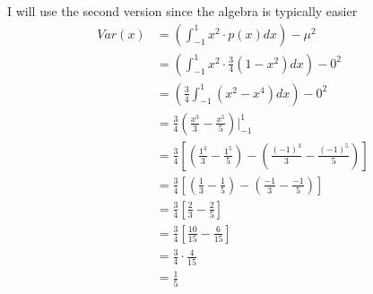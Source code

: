 \documentclass[10pt]{article}
\begin{document}
{\begin{solution}
I will use the second version since the algebra is typically easier
\begin{align*}
Var(x)&=\left( \int_{-1}^1 x^2 \cdot p(x) dx \right) -\mu^2\\
&=\left( \int_{-1}^1 x^2 \cdot \frac{3}{4}(1-x^2) dx \right) -0^2\\
&=\left( \frac{3}{4}\int_{-1}^1 (x^2-x^4) dx \right) -0^2\\
&=\frac{3}{4}\left(\frac{x^3}{3}-\frac{x^5}{5} \right)\Bigg|_{-1}^1\\
&=\frac{3}{4}\left[ \left(\frac{1^3}{3}-\frac{1^5}{5} \right)-\left(\frac{(-1)^3}{3}-\frac{(-1)^5}{5} \right)\right]\\
&=\frac{3}{4}\left[ \left(\frac{1}{3}-\frac{1}{5} \right)-\left(\frac{-1}{3}-\frac{-1}{5} \right)\right]\\
&=\frac{3}{4}\left[ \frac{2}{3}-\frac{2}{5} \right]\\
&=\frac{3}{4}\left[ \frac{10}{15}-\frac{6}{15} \right]\\
&=\frac{3}{4}\cdot\frac{4}{15}\\
&=\frac{1}{5}
\end{align*}
\end{solution}
}

\newpage
\end{document}
